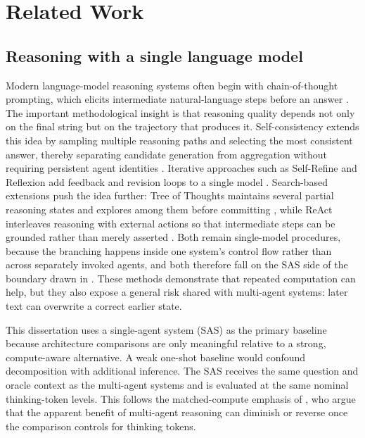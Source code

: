 \chapter{Related Work}
\label{chap:related}

\section{Reasoning with a single language model}

Modern language-model reasoning systems often begin with chain-of-thought prompting, which elicits intermediate natural-language steps before an answer \citep{wei2022chain}. The important methodological insight is that reasoning quality depends not only on the final string but on the trajectory that produces it. Self-consistency extends this idea by sampling multiple reasoning paths and selecting the most consistent answer, thereby separating candidate generation from aggregation without requiring persistent agent identities \citep{wang2023selfconsistency}. Iterative approaches such as Self-Refine and Reflexion add feedback and revision loops to a single model \citep{madaan2023selfrefine,shinn2023reflexion}. Search-based extensions push the idea further: Tree of Thoughts maintains several partial reasoning states and explores among them before committing \citep{yao2023tot}, while ReAct interleaves reasoning with external actions so that intermediate steps can be grounded rather than merely asserted \citep{yao2023react}. Both remain single-model procedures, because the branching happens inside one system's control flow rather than across separately invoked agents, and both therefore fall on the SAS side of the boundary drawn in . These methods demonstrate that repeated computation can help, but they also expose a general risk shared with multi-agent systems: later text can overwrite a correct earlier state.

This dissertation uses a single-agent system (SAS) as the primary baseline because architecture comparisons are only meaningful relative to a strong, compute-aware alternative. A weak one-shot baseline would confound decomposition with additional inference. The SAS receives the same question and oracle context as the multi-agent systems and is evaluated at the same nominal thinking-token levels. This follows the matched-compute emphasis of \citet{tran2026single}, who argue that the apparent benefit of multi-agent reasoning can diminish or reverse once the comparison controls for thinking tokens.

